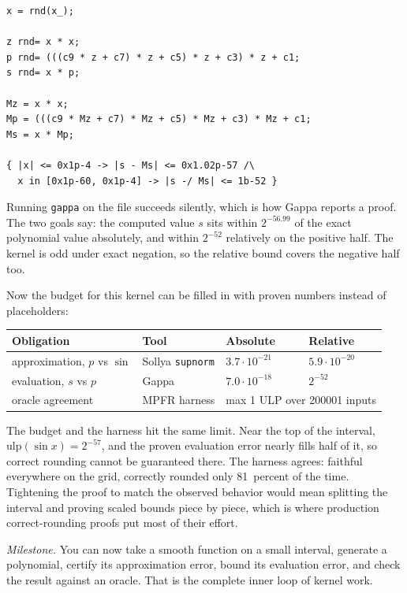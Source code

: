 \documentclass[manuscript, nonacm]{acmart}
\begin{document}
  \begin{lstlisting}[style=sollya]
x = rnd(x_);

z rnd= x * x;
p rnd= (((c9 * z + c7) * z + c5) * z + c3) * z + c1;
s rnd= x * p;

Mz = x * x;
Mp = (((c9 * Mz + c7) * Mz + c5) * Mz + c3) * Mz + c1;
Ms = x * Mp;

{ |x| <= 0x1p-4 -> |s - Ms| <= 0x1.02p-57 /\
  x in [0x1p-60, 0x1p-4] -> |s -/ Ms| <= 1b-52 }
  \end{lstlisting}

  Running \texttt{gappa} on the file succeeds silently, which is how Gappa
  reports a proof. The two goals say: the computed value $s$ sits within
  $2^{-56.99}$ of the exact polynomial value absolutely, and within
  $2^{-52}$ relatively on the positive half. The kernel is odd under
  exact negation, so the relative bound covers the negative half too.

  Now the budget for this kernel can be filled in with proven numbers
  instead of placeholders:

  \begin{table}[tbp]
    \centering
    \begin{tabular}{llll}
      \toprule
      Obligation & Tool & Absolute & Relative \\
      \midrule
      approximation, $p$ vs $\sin$ & Sollya \texttt{supnorm}
      & $3.7 \cdot 10^{-21}$ & $5.9 \cdot 10^{-20}$ \\
      evaluation, $s$ vs $p$ & Gappa
      & $7.0 \cdot 10^{-18}$ & $2^{-52}$ \\
      oracle agreement & MPFR harness
      & \multicolumn{2}{l}{max 1 ULP over 200001 inputs} \\
      \bottomrule
    \end{tabular}
  \end{table}

  The budget and the harness hit the same limit. Near the top of the
  interval, $\mathrm{ulp}(\sin x) = 2^{-57}$, and the proven evaluation error
  nearly fills half of it, so correct rounding cannot be guaranteed there. The
  harness agrees: faithful everywhere on the grid, correctly rounded only
  81~percent of the time. Tightening the proof to match the observed behavior
  would mean splitting the interval and proving scaled bounds piece by piece,
  which is where production correct-rounding proofs put most of their effort.

  \emph{Milestone.}  You can now take a smooth function on a small
  interval, generate a polynomial, certify its approximation error, bound
  its evaluation error, and check the result against an oracle. That is
  the complete inner loop of kernel work.
\end{document}
